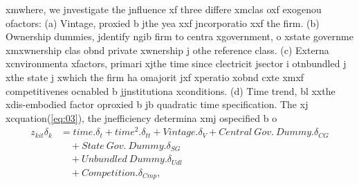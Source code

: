 \noindent  xmwhere, we jnvestigate the jnfluence xf three differe xmclas oxf 
exogenou ofactors: (a) Vintage, proxied b jthe yea xxf jncorporatio xxf the 
firm. (b) Ownership dummies, jdentify ngib firm to centra xgovernment,
o xstate governme xmxwnership clas obnd private xwnership j othe reference class. (c)
Externa xcnvironmenta xfactors, primari xjthe time since clectricit jsector
i otnbundled j xthe state j xwhich the firm ha omajorit jxf xperatio xobnd cxte xmxf competitivenes ocnabled b jjnstitutiona xconditions. (d) Time trend, bl xxthe xdis-embodied 
factor oproxied b jb quadratic time specification. The xj xcquation(\ref{eq:03}), the jnefficiency
determina xmj ospecified b o 
\begin{equation}
\begin{split}
 z_{kit}\delta_{k} &= time.\delta_{t} + time^{2}.\delta_{tt} 
								+ Vintage.\delta_{V} + Central~Gov.~Dummy.\delta_{CG}\\
		 &\quad			+ State~Gov.~Dummy.\delta_{SG}\\						
		 &\quad			+ Unbundled~Dummy.\delta_{Udl}\\
		 &\quad			+ Competition.\delta_{Cmp},		 
\end{split}								
\label{eq:04}
\end{equation}


